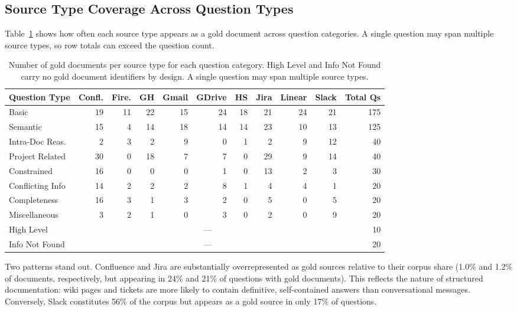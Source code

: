 \documentclass{article}
\begin{document}
\subsection{Source Type Coverage Across Question Types}
\label{app:coverage}

Table~\ref{tab:coverage} shows how often each source type appears as a gold document across question categories. A single question may span multiple source types, so row totals can exceed the question count.

\begin{table}[t]
  \caption{Number of gold documents per source type for each question category. High Level and Info Not Found carry no gold document identifiers by design. A single question may span multiple source types.}
  \label{tab:coverage}
  \centering
  \footnotesize
  \setlength{\tabcolsep}{4pt}
  \begin{tabular}{l*{9}{r}r}
    \toprule
    Question Type & Confl. & Fire. & GH & Gmail & GDrive & HS & Jira & Linear & Slack & Total Qs \\
    \midrule
    Basic              & 19 & 11 & 22 & 15 & 24 & 18 & 21 & 24 & 21 & 175 \\
    Semantic           & 15 &  4 & 14 & 18 & 14 & 14 & 23 & 10 & 13 & 125 \\
    Intra-Doc Reas.    &  2 &  3 &  2 &  9 &  0 &  1 &  2 &  9 & 12 &  40 \\
    Project Related    & 30 &  0 & 18 &  7 &  7 &  0 & 29 &  9 & 14 &  40 \\
    Constrained        & 16 &  0 &  0 &  0 &  1 &  0 & 13 &  2 &  3 &  30 \\
    Conflicting Info   & 14 &  2 &  2 &  2 &  8 &  1 &  4 &  4 &  1 &  20 \\
    Completeness       & 16 &  3 &  1 &  3 &  2 &  0 &  5 &  0 &  5 &  20 \\
    Miscellaneous      &  3 &  2 &  1 &  0 &  3 &  0 &  2 &  0 &  9 &  20 \\
    High Level         & \multicolumn{9}{c}{---} & 10 \\
    Info Not Found     & \multicolumn{9}{c}{---} & 20 \\
    \bottomrule
  \end{tabular}
\end{table}

Two patterns stand out. Confluence and Jira are substantially overrepresented as gold sources relative to their corpus share (1.0\% and 1.2\% of documents, respectively, but appearing in 24\% and 21\% of questions with gold documents). This reflects the nature of structured documentation: wiki pages and tickets are more likely to contain definitive, self-contained answers than conversational messages. Conversely, Slack constitutes 56\% of the corpus but appears as a gold source in only 17\% of questions.
\end{document}
